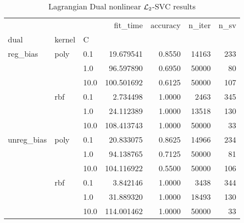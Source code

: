 \begin{table}[H]
\centering
\caption{Lagrangian Dual nonlinear $\protect \mathcal{L}_2$-SVC results}
\label{nonlinear_lagrangian_dual_l2_svc_cv_results}
\begin{tabular}{lllrrrr}
\toprule
           &     &      &    fit\_time &  accuracy &  n\_iter &  n\_sv \\
dual & kernel & C &             &           &         &       \\
\midrule
reg\_bias & poly & 0.1  &   19.679541 &    0.8550 &   14163 &   233 \\
           &     & 1.0  &   96.597890 &    0.6950 &   50000 &    80 \\
           &     & 10.0 &  100.501692 &    0.6125 &   50000 &   107 \\
           & rbf & 0.1  &    2.734498 &    1.0000 &    2463 &   345 \\
           &     & 1.0  &   24.112389 &    1.0000 &   13518 &   130 \\
           &     & 10.0 &  108.413743 &    1.0000 &   50000 &    33 \\
unreg\_bias & poly & 0.1  &   20.833075 &    0.8625 &   14966 &   234 \\
           &     & 1.0  &   94.138765 &    0.7125 &   50000 &    81 \\
           &     & 10.0 &  104.116922 &    0.5500 &   50000 &   106 \\
           & rbf & 0.1  &    3.842146 &    1.0000 &    3438 &   344 \\
           &     & 1.0  &   31.889320 &    1.0000 &   18493 &   130 \\
           &     & 10.0 &  114.001462 &    1.0000 &   50000 &    33 \\
\bottomrule
\end{tabular}
\end{table}
